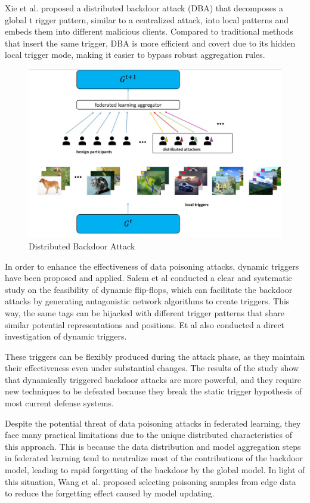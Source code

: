 \documentclass[conference]{IEEEtran}
\begin{document}
Xie et al. \cite{b59} proposed a distributed backdoor attack (DBA) that decomposes a global t
rigger pattern, similar to a centralized attack, into local patterns and embeds
them into different malicious clients. Compared to traditional methods that insert
the same trigger, DBA is more efficient and covert due to its hidden local
trigger mode, making it easier to bypass robust aggregation rules.

\begin{figure}[htbp]
    \centerline{\includegraphics[width=0.8\linewidth,height=0.6\linewidth]{picture/f8.jpg}}
    \caption{Distributed Backdoor Attack}
    \label{fig8}
\end{figure}

In order to enhance the effectiveness of data poisoning attacks,
dynamic triggers have been proposed and applied. Salem et al \cite{b60} conducted a
clear and systematic study on the feasibility of dynamic flip-flops,
which can facilitate the backdoor attacks by generating antagonistic
network algorithms to create triggers. This way, the same tags can be
hijacked with different trigger patterns that share similar potential
representations and positions. Et al \cite{b61} also conducted a direct
investigation of dynamic triggers.

These triggers can be flexibly produced
during the attack phase, as they maintain their effectiveness even
under substantial changes. The results of the study show that dynamically
triggered backdoor attacks are more powerful, and they require new techniques
to be defeated because they break the static trigger hypothesis of most current
defense systems.

Despite the potential threat of data poisoning attacks in federated learning,
they face many practical limitations due to the unique distributed characteristics of this approach\cite{b25}.
This is because the data distribution and model aggregation steps in federated learning tend to neutralize
most of the contributions of the backdoor model, leading to rapid forgetting of the backdoor by the global model.
In light of this situation, Wang et al.\cite{b25} proposed selecting poisoning samples from edge data to reduce the
forgetting effect caused by model updating.
\end{document}
